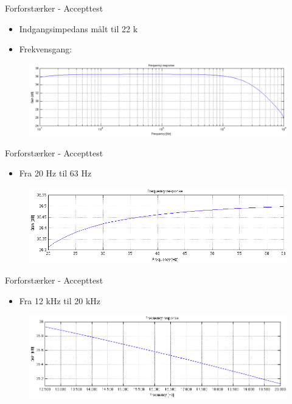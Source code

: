 \begin{frame}{Forforstærker - Accepttest}
\begin{itemize}
\item Indgangsimpedans målt til 22 k\ohm
\item Frekvensgang: 
\end{itemize}
\begin{figure}[h]
\centering
\includegraphics[scale=.25]{images/frekvensrespons-forforstaerker.png}
\end{figure}

\end{frame}

\begin{frame}{Forforstærker - Accepttest}
\begin{itemize}
\item Fra 20 Hz til 63 Hz
\end{itemize}
\begin{figure}[h]
\centering
\includegraphics[scale=.3]{images/fr20-63.png}
\end{figure}
\end{frame}

\begin{frame}{Forforstærker - Accepttest}
\begin{itemize}
\item Fra 12 kHz til 20 kHz
\end{itemize}
\begin{figure}[h]
\centering
\includegraphics[scale=.3]{images/fr12-20k.png}
\end{figure}
\end{frame}

